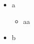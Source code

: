 \begin{itemize}
  \item a
        \begin{itemize}
          \item aa
        \end{itemize}

  \item b
\end{itemize}
